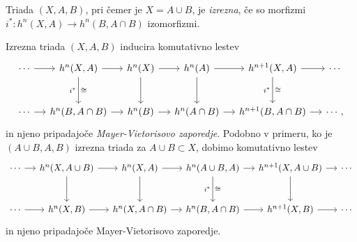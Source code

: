 \begin{definicija}
Triada $(X, A, B)$, pri čemer je $X = A \cup B$, je
\emph{izrezna}, če so morfizmi
$i^* \colon h^n(X, A) \to h^n(B, A \cap B)$ izomorfizmi.
\end{definicija}

\begin{opomba}
Izrezna triada $(X, A, B)$ inducira komutativno lestev
\[
\begin{tikzcd}[row sep=large, column sep=small]
\cdots \arrow[r] &
h^n(X,A) \arrow[r] \arrow[d, "i^*"', "\cong"] &
h^n(X) \arrow[r] \arrow[d] &
h^n(A) \arrow[r] \arrow[d] &
h^{n+1}(X,A) \arrow[r] \arrow[d, "i^*"', "\cong"] &
\cdots \\
\cdots \arrow[r] &
h^n(B,A \cap B) \arrow[r] &
h^n(B) \arrow[r] &
h^n(A \cap B) \arrow[r] &
h^{n+1}(B,A \cap B) \arrow[r] &
\cdots,
\end{tikzcd}
\]
in njeno pripadajoče
\emph{Mayer-Vietorisovo zaporedje}.
Podobno v primeru, ko je $(A \cup B, A, B)$ izrezna triada za
$A \cup B \subset X$, dobimo komutativno lestev
\[
\begin{tikzcd}[row sep=large, column sep=small]
\cdots \arrow[r] &
h^n(X, A \cup B) \arrow[r] \arrow[d] &
h^n(X, A) \arrow[r] \arrow[d] &
h^n(A \cup B, A) \arrow[r] \arrow[d, "i^*"', "\cong"] &
h^{n+1}(X,A \cup B) \arrow[r] \arrow[d] &
\cdots \\
\cdots \arrow[r] &
h^n(X, B) \arrow[r] &
h^n(X, A \cap B) \arrow[r] &
h^n(B, A \cap B) \arrow[r] &
h^{n+1}(X, B) \arrow[r] &
\cdots
\end{tikzcd}
\]
in njeno pripadajoče Mayer-Vietorisovo zaporedje.
\end{opomba}
